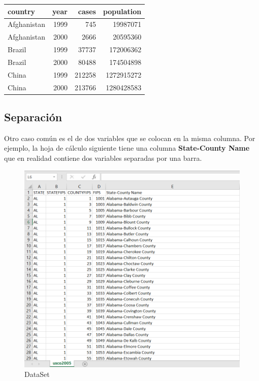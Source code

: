 \documentclass[
]{book}
\begin{document}
\begin{tabular}{l|r|r|r}
\hline
country & year & cases & population\\
\hline
Afghanistan & 1999 & 745 & 19987071\\
\hline
Afghanistan & 2000 & 2666 & 20595360\\
\hline
Brazil & 1999 & 37737 & 172006362\\
\hline
Brazil & 2000 & 80488 & 174504898\\
\hline
China & 1999 & 212258 & 1272915272\\
\hline
China & 2000 & 213766 & 1280428583\\
\hline
\end{tabular}

\subsection{Separación}\label{separaciuxf3n}

Otro caso común es el de dos variables que se colocan en la misma columna. Por ejemplo, la hoja de cálculo siguiente tiene una columna \textbf{State-County Name} que en realidad contiene dos variables separadas por una barra.

\begin{figure}

{\centering \includegraphics[width=1\linewidth]{images/figura6} 

}

\caption{DataSet}\label{fig:figura6}
\end{figure}
\end{document}
